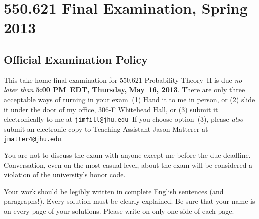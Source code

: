 \newcommand{\Line}{$\underline{\qquad\qquad\qquad\qquad}$}
\newcommand{\X}{$\qquad$}
\newcommand{\lb}{\left\{}
\newcommand{\rb}{\right\}}
\newcommand{\lsb}{\left[}
\newcommand{\rsb}{\right]}
\newcommand{\lp}{\left(}
\newcommand{\rp}{\right)}
\newcommand{\ls}{\left|}
\newcommand{\rs}{\right|}
\newcommand{\lss}{\left\|}
\newcommand{\rss}{\right\|}

\newcommand{\vs}{\vspace{\smallskipamount}\noindent}
\newcommand{\vm}{\vspace{\medskipamount}\noindent}
\newcommand{\vb}{\vspace{\bigskipamount}\noindent}

\newcommand{\ra}{\rightarrow}
\newcommand{\la}{\leftarrow}
\newcommand{\implies}{\Longrightarrow}


\section*{550.621 Final Examination, Spring 2013}

\subsection*{Official Examination Policy}

\hspace{\parindent}
This take-home final examination for 550.621 Probability Theory~II is due {\em
no later than\/} {\bf 5:00 PM~EDT, Thursday, May~16, 2013}.  There
are only three acceptable ways of turning in your exam: (1) Hand it to me in
person, or (2) slide it under the door of my office, 306-F Whitehead Hall, or
(3) submit it electronically to me at {\tt jimfill@jhu.edu}.  If you choose option~(3),
please \emph{also} submit an electronic copy to Teaching Assistant Jason Matterer at 
{\tt jmatter4@jhu.edu}. 

You are not to discuss the exam with anyone except me before 
the due deadline.  Conversation, even on the most casual level, about the exam
will be considered a violation of the university's honor code.

Your work should be legibly written in complete English sentences (and paragraphs!). 
Every solution must be clearly explained.  Be sure that your name is on every page of
your solutions.  Please write on only one side of each page.

